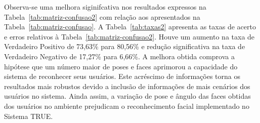 	Observa-se uma melhora siginifcativa nos resultados expressos na Tabela~\ref{tab:matriz-confusao2} com relação aos apresentados na Tabela~\ref{tab:matriz-confusao}. A Tabela~\ref{tab:taxas2} apresenta as taxas de acerto e erros relativos à Tabela~\ref{tab:matriz-confusao2}. Houve um aumento na taxa de Verdadeiro Positivo de 73,63\% para 80,56\% e redução significativa na taxa de Verdadeiro Negativo de 17,27\% para 6,66\%. A melhora obtida comprova a hipótese que um número maior de poses e faces aprimorou a capacidade do sistema de reconhecer seus usuários. Este acréscimo de informações torna os resultados mais robustos devido a inclusão de informações de mais cenários dos usuários no sistema. Ainda assim, a variação de pose e ângulo das faces obtidas dos usuários no ambiente prejudicam o reconhecimento facial implementado no Sistema TRUE.



